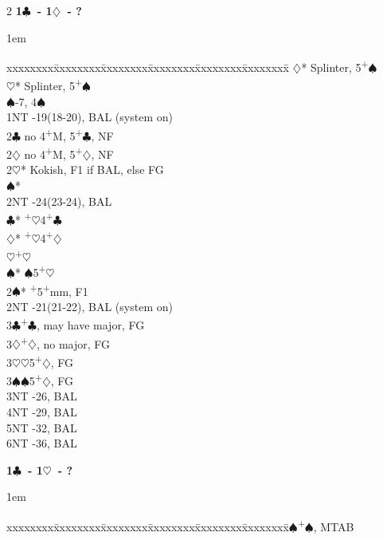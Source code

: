 \documentclass[10pt]{article}
\renewcommand{\c}{$\clubsuit$}
\renewcommand{\d}{$\diamondsuit$}
\newcommand{\h}{$\heartsuit$}
\newcommand{\s}{$\spadesuit$}
\newcommand{\p}{\textsuperscript{+}}
\newenvironment{bidtable}[1][]
{\textbf{#1}
  \begin{adjustwidth}{1em}{}
    \addvspace{2pt}
    \begin{tabbing}
      xxxxxxxx\=xxxxxxxx\=xxxxxxxx\=xxxxxxxx\=xxxxxxxx\=xxxxxxxx\=\kill}
{\end{tabbing}\end{adjustwidth}\bigskip}%
\begin{document}
\begin{multicols*}{2}
\begin{bidtable}[1\c\ - 1\d\ - ?]
     \d* \> Splinter, 5\p\s                    \\
     \h* \> Splinter, 5\p\s                    \\
     \s  {}-7, 4\s                           \\
1NT  -19(18-20), BAL (system on)              \\
2\c  \> no 4\p M, 5\p\c, NF                        \\
2\d  \> no 4\p M, 5\p\d, NF                        \\
2\h* \> Kokish, F1 if BAL, else FG                 \\
     \s* \>                                    \\
     \>      \> 2NT      -24(23-24), BAL      \\
     \>      \c*     {}\p\h 4\p\c            \\
     \>      \d*     {}\p\h 4\p\d            \\
     \>      \h      {}\p\h                  \\
     \>      \s*     {}\s 5\p\h              \\
2\s* {}\p 5\p mm, F1                             \\
2NT  -21(21-22), BAL (system on)              \\
3\c  {}\p\c, may have major, FG                  \\
3\d  {}\p\d, no major, FG                        \\
3\h  {}\h 5\p\d, FG                              \\
3\s  {}\s 5\p\d, FG                              \\
3NT  -26, BAL                                 \\
4NT  -29, BAL                                 \\
5NT  -32, BAL                                 \\
6NT  -36, BAL
\end{bidtable}

\begin{bidtable}[1\c\ - 1\h\ - ?]
1\s {}\p\s, MTAB                                  \\


\end{bidtable}
\end{multicols*}
\end{document}
